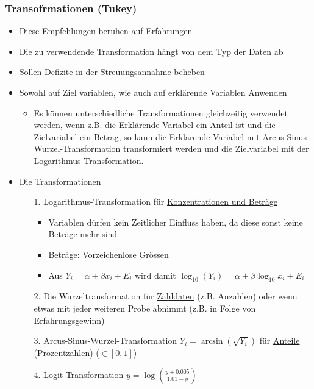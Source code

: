 \subsubsection{Transofrmationen (Tukey)}
\label{subsubsec:Transformationen}
\begin{itemize}
	\item Diese Empfehlungen beruhen auf Erfahrungen
	\item Die zu verwendende Transformation hängt von dem Typ der Daten ab
	\item Sollen Defizite in der Streuungsannahme beheben
	\item Sowohl auf Ziel variablen, wie auch auf erklärende Variablen Anwenden
	\begin{itemize}
		\item Es können unterschiedliche Transformationen gleichzeitig verwendet werden, wenn z.B. die Erklärende Variabel ein Anteil ist und die Zielvariabel ein Betrag, so kann die Erklärende Variabel mit Arcus-Sinus-Wurzel-Transformation transformiert werden und die Zielvariabel mit der Logarithmus-Transformation.
	\end{itemize}
	\item Die Transformationen
	\begin{itemize}
		\item [1.] Logarithmus-Transformation für \underline{Konzentrationen und Beträge}
		\begin{itemize}
			\item Variablen dürfen kein Zeitlicher Einfluss haben, da diese sonst keine Beträge mehr sind
			\item Beträge: Vorzeichenlose Grössen
			\item Aus $Y_i = \alpha+\beta x_i+E_i$ wird damit $\log_{10}(Y_i) =\alpha+\beta\log_{10}x_i+E_i$
		\end{itemize}
		\item [2.] Die Wurzeltransformation für \underline{Zähldaten} (z.B. Anzahlen) oder wenn etwas mit jeder weiteren Probe abnimmt (z.B. in Folge von Erfahrungsgewinn)
		\item [3.] Arcus-Sinus-Wurzel-Transformation $Y_i = \arcsin(\sqrt{Y_i})$ für \underline{Anteile (Prozentzahlen)} ($\in\left[0,1\right]$)
		\item [4.] Logit-Transformation $y = \log\left(\frac{y+0.005}{1.01-y}\right)$
	\end{itemize}
\end{itemize}

